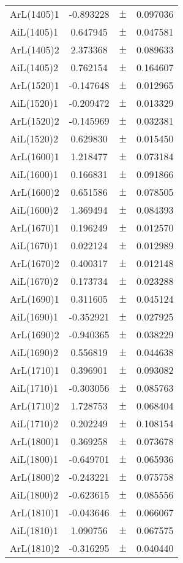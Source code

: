 \begin{table}
\begin{tiny}
\begin{tabular}{lccc}
ArL(1405)1 & -0.893228 & $\pm$ & 0.097036 \\
AiL(1405)1 & 0.647945 & $\pm$ & 0.047581 \\
ArL(1405)2 & 2.373368 & $\pm$ & 0.089633 \\
AiL(1405)2 & 0.762154 & $\pm$ & 0.164607 \\
ArL(1520)1 & -0.147648 & $\pm$ & 0.012965 \\
AiL(1520)1 & -0.209472 & $\pm$ & 0.013329 \\
ArL(1520)2 & -0.145969 & $\pm$ & 0.032381 \\
AiL(1520)2 & 0.629830 & $\pm$ & 0.015450 \\
ArL(1600)1 & 1.218477 & $\pm$ & 0.073184 \\
AiL(1600)1 & 0.166831 & $\pm$ & 0.091866 \\
ArL(1600)2 & 0.651586 & $\pm$ & 0.078505 \\
AiL(1600)2 & 1.369494 & $\pm$ & 0.084393 \\
ArL(1670)1 & 0.196249 & $\pm$ & 0.012570 \\
AiL(1670)1 & 0.022124 & $\pm$ & 0.012989 \\
ArL(1670)2 & 0.400317 & $\pm$ & 0.012148 \\
AiL(1670)2 & 0.173734 & $\pm$ & 0.023288 \\
ArL(1690)1 & 0.311605 & $\pm$ & 0.045124 \\
AiL(1690)1 & -0.352921 & $\pm$ & 0.027925 \\
ArL(1690)2 & -0.940365 & $\pm$ & 0.038229 \\
AiL(1690)2 & 0.556819 & $\pm$ & 0.044638 \\
ArL(1710)1 & 0.396901 & $\pm$ & 0.093082 \\
AiL(1710)1 & -0.303056 & $\pm$ & 0.085763 \\
ArL(1710)2 & 1.728753 & $\pm$ & 0.068404 \\
AiL(1710)2 & 0.202249 & $\pm$ & 0.108154 \\
ArL(1800)1 & 0.369258 & $\pm$ & 0.073678 \\
AiL(1800)1 & -0.649701 & $\pm$ & 0.065936 \\
ArL(1800)2 & -0.243221 & $\pm$ & 0.075758 \\
AiL(1800)2 & -0.623615 & $\pm$ & 0.085556 \\
ArL(1810)1 & -0.043646 & $\pm$ & 0.066067 \\
AiL(1810)1 & 1.090756 & $\pm$ & 0.067575 \\
ArL(1810)2 & -0.316295 & $\pm$ & 0.040440 \\

\end{tabular}
\end{tiny}
\end{table}
